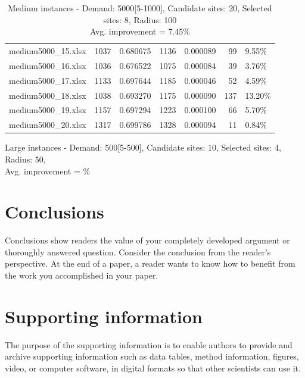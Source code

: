 \documentclass[11pt, a4paper]{article}
\begin{document}
\begin{table}[h!]
\begin{adjustbox}{max width=\textwidth}
\begin{tabular}{lrrrrrl}
		 medium5000\_15.xlsx &   1037 &           0.680675 &    1136 &           0.000089 &            99 &        9.55\% \\
		 medium5000\_16.xlsx &   1036 &           0.676522 &    1075 &           0.000084 &            39 &        3.76\% \\
		 medium5000\_17.xlsx &   1133 &           0.697644 &    1185 &           0.000046 &            52 &        4.59\% \\
		 medium5000\_18.xlsx &   1038 &           0.693270 &    1175 &           0.000090 &           137 &       13.20\% \\
		 medium5000\_19.xlsx &   1157 &           0.697294 &    1223 &           0.000100 &            66 &        5.70\% \\
		 medium5000\_20.xlsx &   1317 &           0.699786 &    1328 &           0.000094 &            11 &        0.84\% \\
		\bottomrule
		\end{tabular}
\end{adjustbox}
\caption{Medium instances - Demand: 5000[5-1000], Candidate sites: 20, Selected sites: 8, Radius: 100\\ \centering Avg. improvement = 7.45\%}
\label{tab:medium_instances}
\end{table}


\begin{table}[h!]
	\centering
	\begin{adjustbox}{max width=\textwidth}
\end{adjustbox}
\caption{Large instances - Demand: 500[5-500], Candidate sites: 10, Selected sites: 4, Radius: 50,\\ \centering Avg. improvement = \%}
\label{tab:medium_instances}
\end{table}


\section{Conclusions}
Conclusions show readers the value of your completely developed argument or thoroughly answered question. Consider the conclusion from the reader's perspective. At the end of a paper, a reader wants to know how to benefit from the work you accomplished in your paper. 

\appendix
\section{Supporting information}
The purpose of the supporting information is to enable authors to provide and archive supporting information such as data tables, method information, figures, video, or computer software, in digital formats so that other scientists can use it.

\small \singlespacing
 

\end{document}
